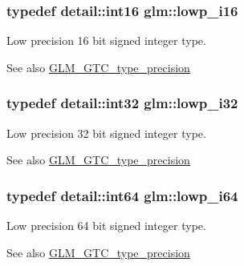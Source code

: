 \subsubsection[{lowp\+\_\+i16}]{\setlength{\rightskip}{0pt plus 5cm}typedef {\bf detail\+::int16} {\bf glm\+::lowp\+\_\+i16}}\label{group__gtc__type__precision_gaf7bbfd31bcec25a416ea94d09efb5451}
Low precision 16 bit signed integer type. \begin{DoxySeeAlso}{See also}
\hyperlink{group__gtc__type__precision}{G\+L\+M\+\_\+\+G\+T\+C\+\_\+type\+\_\+precision} 
\end{DoxySeeAlso}
\hypertarget{group__gtc__type__precision_ga70fd34e8b8cffc92739161284ed77328}{}
\subsubsection[{lowp\+\_\+i32}]{\setlength{\rightskip}{0pt plus 5cm}typedef {\bf detail\+::int32} {\bf glm\+::lowp\+\_\+i32}}\label{group__gtc__type__precision_ga70fd34e8b8cffc92739161284ed77328}
Low precision 32 bit signed integer type. \begin{DoxySeeAlso}{See also}
\hyperlink{group__gtc__type__precision}{G\+L\+M\+\_\+\+G\+T\+C\+\_\+type\+\_\+precision} 
\end{DoxySeeAlso}
\hypertarget{group__gtc__type__precision_ga1f4ded25f71c0f3b4518936d50b54b6e}{}
\subsubsection[{lowp\+\_\+i64}]{\setlength{\rightskip}{0pt plus 5cm}typedef detail\+::int64 {\bf glm\+::lowp\+\_\+i64}}\label{group__gtc__type__precision_ga1f4ded25f71c0f3b4518936d50b54b6e}
Low precision 64 bit signed integer type. \begin{DoxySeeAlso}{See also}
\hyperlink{group__gtc__type__precision}{G\+L\+M\+\_\+\+G\+T\+C\+\_\+type\+\_\+precision} 
\end{DoxySeeAlso}
\hypertarget{group__gtc__type__precision_gaa2e13ee29c90f75658beed6082541097}{}
